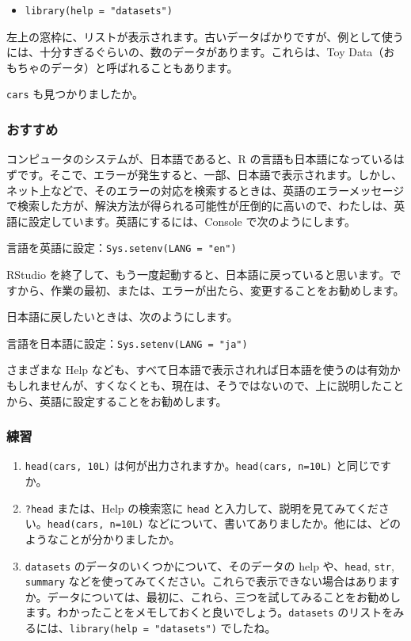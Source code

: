 \documentclass[
]{bxjsbook}
\providecommand{\tightlist}{%
  \setlength{\itemsep}{0pt}\setlength{\parskip}{0pt}}
\theoremstyle{definition}
\theoremstyle{definition}
\theoremstyle{definition}
\theoremstyle{definition}
\theoremstyle{remark}
\begin{document}
\begin{itemize}
\tightlist
\item
  \texttt{library(help\ =\ "datasets")}
\end{itemize}

左上の窓枠に、リストが表示されます。古いデータばかりですが、例として使うには、十分すぎるぐらいの、数のデータがあります。これらは、Toy Data（おもちゃのデータ）と呼ばれることもあります。

\texttt{cars} も見つかりましたか。

\hypertarget{ux304aux3059ux3059ux3081}{%
\subsubsection{おすすめ}\label{ux304aux3059ux3059ux3081}}

コンピュータのシステムが、日本語であると、R の言語も日本語になっているはずです。そこで、エラーが発生すると、一部、日本語で表示されます。しかし、ネット上などで、そのエラーの対応を検索するときは、英語のエラーメッセージで検索した方が、解決方法が得られる可能性が圧倒的に高いので、わたしは、英語に設定しています。英語にするには、Console で次のようにします。

言語を英語に設定：\texttt{Sys.setenv(LANG\ =\ "en")}

RStudio を終了して、もう一度起動すると、日本語に戻っていると思います。ですから、作業の最初、または、エラーが出たら、変更することをお勧めします。

日本語に戻したいときは、次のようにします。

言語を日本語に設定：\texttt{Sys.setenv(LANG\ =\ "ja")}

さまざまな Help なども、すべて日本語で表示されれば日本語を使うのは有効かもしれませんが、すくなくとも、現在は、そうではないので、上に説明したことから、英語に設定することをお勧めします。

\hypertarget{ux7df4ux7fd2}{%
\subsubsection{練習}\label{ux7df4ux7fd2}}

\begin{enumerate}
\def\labelenumi{\arabic{enumi}.}
\tightlist
\item
  \texttt{head(cars,\ 10L)} は何が出力されますか。\texttt{head(cars,\ n=10L)} と同じですか。
\item
  \texttt{?head} または、Help の検索窓に \texttt{head} と入力して、説明を見てみてください。\texttt{head(cars,\ n=10L)} などについて、書いてありましたか。他には、どのようなことが分かりましたか。
\item
  \texttt{datasets} のデータのいくつかについて、そのデータの help や、\texttt{head}, \texttt{str}, \texttt{summary} などを使ってみてください。これらで表示できない場合はありますか。データについては、最初に、これら、三つを試してみることをお勧めします。わかったことをメモしておくと良いでしょう。\texttt{datasets} のリストをみるには、\texttt{library(help\ =\ "datasets")} でしたね。
\end{enumerate}
\end{document}
